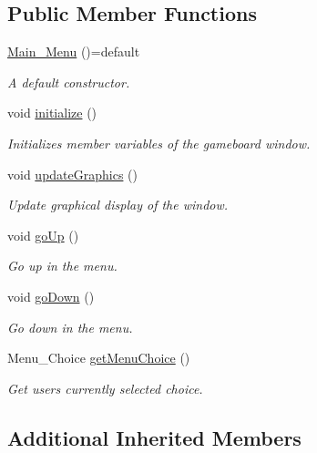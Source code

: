 \subsection*{Public Member Functions}
\begin{DoxyCompactItemize}
\item 
\hyperlink{classMain__Menu_a1f1fce181168ba08a7c2debe7e5333ef}{Main\+\_\+\+Menu} ()=default
\begin{DoxyCompactList}\small\item\em A default constructor. \end{DoxyCompactList}\item 
void \hyperlink{classMain__Menu_a453355fbb089549540a20eb7e540f04e}{initialize} ()
\begin{DoxyCompactList}\small\item\em Initializes member variables of the gameboard window. \end{DoxyCompactList}\item 
void \hyperlink{classMain__Menu_aa12d253d587d418b84550fffbc077478}{update\+Graphics} ()
\begin{DoxyCompactList}\small\item\em Update graphical display of the window. \end{DoxyCompactList}\item 
void \hyperlink{classMain__Menu_abd0bafbcc3a3aac9811cc6fde075b29c}{go\+Up} ()
\begin{DoxyCompactList}\small\item\em Go up in the menu. \end{DoxyCompactList}\item 
void \hyperlink{classMain__Menu_a0f95b5c387bd1cc18ba236a99060737c}{go\+Down} ()
\begin{DoxyCompactList}\small\item\em Go down in the menu. \end{DoxyCompactList}\item 
Menu\+\_\+\+Choice \hyperlink{classMain__Menu_a33b9a75fcda233154f81ed32f8f724d9}{get\+Menu\+Choice} ()
\begin{DoxyCompactList}\small\item\em Get user\textquotesingle{}s currently selected choice. \end{DoxyCompactList}\end{DoxyCompactItemize}
\subsection*{Additional Inherited Members}


